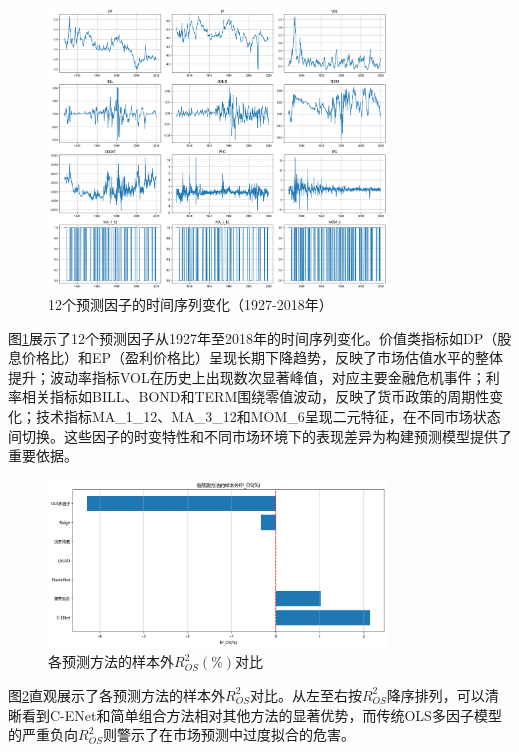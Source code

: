 \documentclass[12pt, a4paper]{article}
\begin{document}
\begin{figure}[htbp]
\centering
\includegraphics[width=0.8\textwidth]{./img/预测因子时间序列变化.png}
\caption{12个预测因子的时间序列变化（1927-2018年）}
\label{fig:predictor_timeseries}
\end{figure}

图\ref{fig:predictor_timeseries}展示了12个预测因子从1927年至2018年的时间序列变化。价值类指标如DP（股息价格比）和EP（盈利价格比）呈现长期下降趋势，反映了市场估值水平的整体提升；波动率指标VOL在历史上出现数次显著峰值，对应主要金融危机事件；利率相关指标如BILL、BOND和TERM围绕零值波动，反映了货币政策的周期性变化；技术指标MA\_1\_12、MA\_3\_12和MOM\_6呈现二元特征，在不同市场状态间切换。这些因子的时变特性和不同市场环境下的表现差异为构建预测模型提供了重要依据。

\begin{figure}[htbp]
\centering
\includegraphics[width=0.8\textwidth]{./img/各预测方法的样本外R2_OS.png}
\caption{各预测方法的样本外$R^2_{OS}(\%)$对比}
\label{fig:r2_os_comparison}
\end{figure}

图\ref{fig:r2_os_comparison}直观展示了各预测方法的样本外$R^2_{OS}$对比。从左至右按$R^2_{OS}$降序排列，可以清晰看到C-ENet和简单组合方法相对其他方法的显著优势，而传统OLS多因子模型的严重负向$R^2_{OS}$则警示了在市场预测中过度拟合的危害。
\end{document}
